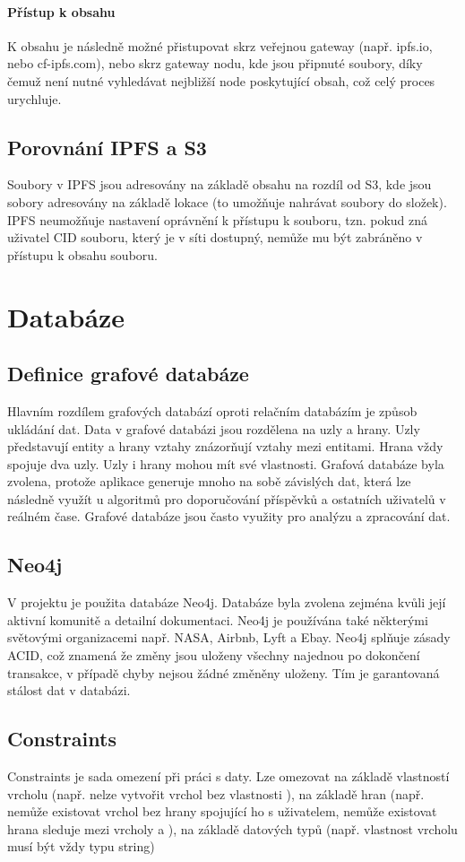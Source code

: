 \documentclass[12pt, a4paper,
 twoside,        %
 openright
]{report}
\begin{document}
            \paragraph{Přístup k obsahu} K obsahu je následně možné přistupovat skrz veřejnou gateway (např. ipfs.io, nebo cf-ipfs.com), nebo skrz gateway nodu, kde jsou připnuté soubory, díky čemuž není nutné vyhledávat nejbližší node poskytující obsah, což celý proces urychluje.
        \subsection{Porovnání IPFS a S3}
            Soubory v IPFS jsou adresovány na základě obsahu na rozdíl od S3, kde jsou sobory adresovány na základě lokace (to umožňuje nahrávat soubory do složek). IPFS neumožňuje nastavení oprávnění k přístupu k souboru, tzn. pokud zná uživatel CID souboru, který je v síti dostupný, nemůže mu být zabráněno v přístupu k obsahu souboru.

    \section{Databáze}
    \subsection{Definice grafové databáze}
        Hlavním rozdílem grafových databází oproti relačním databázím je způsob ukládání dat. 
        Data v grafové databázi jsou rozdělena na uzly a hrany. Uzly představují entity a hrany vztahy znázorňují vztahy mezi entitami. Hrana vždy spojuje dva uzly.
        Uzly i hrany mohou mít své vlastnosti. Grafová databáze byla zvolena, protože aplikace generuje mnoho na sobě závislých dat, která
        lze následně využít u algoritmů pro doporučování příspěvků a ostatních uživatelů v reálném čase. Grafové databáze jsou často využity pro analýzu a zpracování dat.
    \subsection{Neo4j}
        V projektu je použita databáze Neo4j. Databáze byla zvolena zejména kvůli její aktivní komunitě a detailní dokumentaci. Neo4j je používána také některými světovými organizacemi např. NASA, Airbnb, Lyft a Ebay. Neo4j splňuje zásady ACID, což znamená že změny jsou uloženy všechny najednou po dokončení transakce, v případě chyby nejsou žádné změněny uloženy. Tím je garantovaná stálost dat v databázi.
    \subsection{Constraints}
        Constraints je sada omezení při práci s daty. Lze omezovat na základě vlastností vrcholu (např. nelze vytvořit vrchol  bez vlastnosti ), na základě hran (např. nemůže existovat vrchol  bez hrany  spojující ho s uživatelem, nemůže existovat hrana sleduje mezi vrcholy  a ), na základě datových typů (např. vlastnost  vrcholu  musí být vždy typu string)
\end{document}
